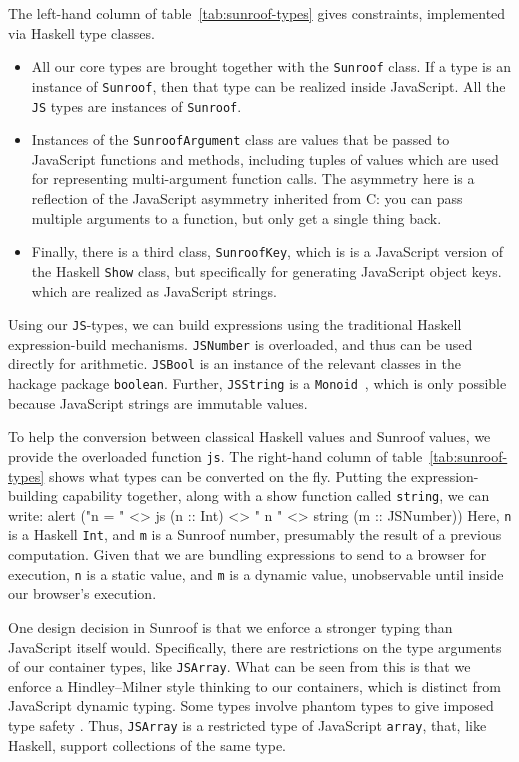 \documentclass{llncs}
\newcommand{\Src}[1]{{\tt{#1}}}
\newenvironment{Code}{\verbatim}{\endverbatim}
\begin{document}
The left-hand column of table~\ref{tab:sunroof-types} gives constraints,
implemented via Haskell type classes.
\begin{itemize}
\item  All our core types are brought together with the \Src{Sunroof} class.
If a type is an instance of \Src{Sunroof}, then that type can be realized inside JavaScript.
All the \Src{JS} types are instances of \Src{Sunroof}.

\item Instances of the \Src{SunroofArgument} class
are values that be passed to JavaScript functions and methods,
including tuples of values which are used for representing multi-argument 
function calls.
The asymmetry here is a reflection of the JavaScript
asymmetry inherited from C: you can pass multiple arguments
to a function, but only get a single thing back.

\item Finally, there is a third class, \Src{SunroofKey}, which is
is a JavaScript version of the Haskell \Src{Show} class,
but specifically for generating JavaScript object keys.
which are realized as JavaScript strings.
\end{itemize}

Using our \Src{JS}-types, we can build expressions using the traditional Haskell expression-build
mechanisms. \Src{JSNumber} is overloaded, and thus can be used directly for arithmetic.
\Src{JSBool} is an instance of the relevant classes in the hackage package \verb|boolean|.
Further, \Src{JSString} is a \Src{Monoid}~\cite{..}, which is only possible because JavaScript
strings are immutable values.

To help the conversion between classical Haskell values and Sunroof values,
we provide the overloaded function \Src{js}. The right-hand column of 
table~\ref{tab:sunroof-types} shows what types can be converted on the fly.
Putting the expression-building capability together, 
along with a show function called \Src{string}, we can write:
\begin{Code}
alert ("n =  " <> js (n :: Int) <> " n " <> string (m :: JSNumber))
\end{Code}
Here, \Src{n} is a Haskell \Src{Int}, and \Src{m} is a Sunroof number,
presumably the result of a previous computation. Given that we are 
bundling expressions to send to a browser for execution, \Src{n}
is a static value, and \Src{m} is a dynamic value, unobservable until inside our browser's execution.

One design decision in Sunroof is that we enforce a stronger typing than JavaScript itself would.
Specifically, there are restrictions on the type arguments of our container types,
like \Src{JSArray}. What can be seen from this is that we
enforce a Hindley–Milner style thinking to our containers,
which is distinct from JavaScript dynamic typing.
Some types involve
phantom types to give imposed type safety \cite{Cheney:03:FirstClassPhantomTypes}.
Thus, \Src{JSArray} is a restricted type of JavaScript \Src{array}, that, like Haskell,
support collections of the same type.
\end{document}
